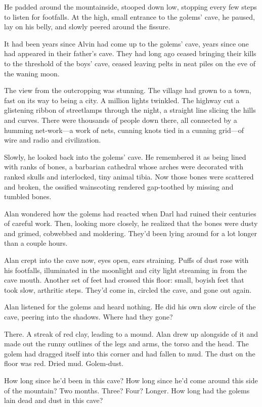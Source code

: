 He padded around the mountainside, stooped down low, stopping every
few steps to listen for footfalls.  At the high, small entrance to the
golems' cave, he paused, lay on his belly, and slowly peered around
the fissure.

It had been years since Alvin had come up to the golems' cave, years
since one had appeared in their father's cave.  They had long ago
ceased bringing their kills to the threshold of the boys' cave, ceased
leaving pelts in neat piles on the eve of the waning moon.

The view from the outcropping was stunning.  The village had grown to
a town, fast on its way to being a city.  A million lights twinkled. 
The highway cut a glistening ribbon of streetlamps through the night,
a straight line slicing the hills and curves.  There were thousands of
people down there, all connected by a humming net-work---a work of
nets, cunning knots tied in a cunning grid---of wire and radio and
civilization.

Slowly, he looked back into the golems' cave.  He remembered it as
being lined with ranks of bones, a barbarian cathedral whose arches
were decorated with ranked skulls and interlocked, tiny animal tibia. 
Now those bones were scattered and broken, the ossified wainscoting
rendered gap-toothed by missing and tumbled bones.

Alan wondered how the golems had reacted when Darl had ruined their
centuries of careful work.  Then, looking more closely, he realized
that the bones were dusty and grimed, cobwebbed and moldering.  They'd
been lying around for a lot longer than a couple hours.

Alan crept into the cave now, eyes open, ears straining.  Puffs of
dust rose with his footfalls, illuminated in the moonlight and city
light streaming in from the cave mouth.  Another set of feet had
crossed this floor:  small, boyish feet that took slow, arthritic
steps.  They'd come in, circled the cave, and gone out again.

Alan listened for the golems and heard nothing.  He did his own slow
circle of the cave, peering into the shadows.  Where had they gone?

There.  A streak of red clay, leading to a mound.  Alan drew up
alongside of it and made out the runny outlines of the legs and arms,
the torso and the head.  The golem had dragged itself into this corner
and had fallen to mud.  The dust on the floor was red.  Dried mud. 
Golem-dust.

How long since he'd been in this cave?  How long since he'd come
around this side of the mountain?  Two months.  Three?  Four?  Longer. 
How long had the golems lain dead and dust in this cave?

